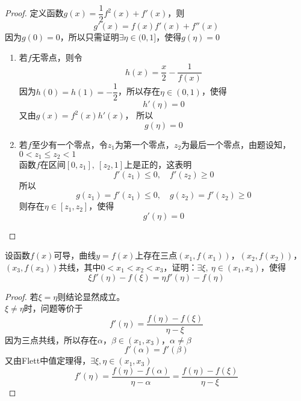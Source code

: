 \begin{proof}

    定义函数$g(x) = \dfrac{1}{2}f^2(x) + f'(x)$，则
    $$g'(x) = f(x) f'(x) + f''(x)$$
    因为$g(0) = 0$，所以只需证明$\exists \eta \in (0,1]$，使得$g(\eta) = 0$

    \begin{enumerate}

        \item 
            若$f$无零点，则令
            $$h(x) = \dfrac{x}{2} - \dfrac{1}{f(x)}$$
            因为$h(0) = h(1) = -\dfrac{1}{2}$，所以存在$\eta \in (0,1)$，使得
            $$h'(\eta) = 0$$
            又由$g(x) = f^2(x) h'(x)$，
            所以
            $$g(\eta) = 0$$

        \item 
            若$f$至少有一个零点，令$z_1$为第一个零点，$z_2$为最后一个零点，由题设知，$0 < z_1 \leq z_2 < 1$\\
            函数$f$在区间$[0,z_1],\ [z_2,1]$上是正的，这表明
            $$f'(z_1) \leq 0,\quad f'(z_2) \geq 0$$
            所以
            $$g(z_1) = f'(z_1) \leq 0, \quad g(z_2) = f'(z_2) \geq 0$$
            则存在$\eta \in [z_1, z_2]$，使得
            $$g'(\eta) = 0$$

    \end{enumerate}

\end{proof}

\begin{proposition}

    设函数$f(x)$可导，曲线$y = f(x)$上存在三点$(x_1, f(x_1))$，$(x_2, f(x_2))$，$(x_3, f(x_3))$共线，其中$0 < x_1 < x_2 < x_3$，证明：$\exists \xi,\  \eta \in (x_1,x_3)$，使得
    $$\xi f'(\eta) - f(\xi) = \eta f'(\eta) - f(\eta)$$

\end{proposition}

\begin{proof}

    若$\xi = \eta$则结论显然成立。\\
    $\xi \neq \eta$时，问题等价于
    $$ f'(\eta) = \dfrac{f(\eta) - f(\xi)}{\eta - \xi}$$
    因为三点共线，所以存在$\alpha$，$\beta \in (x_1, x_3)$，$\alpha \neq \beta$
    $$f'(\alpha) = f'(\beta)$$
    又由\textup{Flett}中值定理得，$\exists \xi,\eta \in (x_1,x_3)$
    $$f'(\eta) = \dfrac{f(\eta) - f(\alpha)}{\eta - \alpha} = \dfrac{f(\eta) - f(\xi)}{\eta - \xi}$$

\end{proof}


